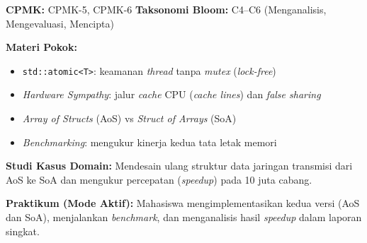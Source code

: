 \documentclass[12pt,a4paper]{article}
\begin{document}
\begin{tcolorbox}[colback=white, colframe=uniblue, title={\textbf{Minggu 14: Konkurensi Modern II --- \textit{Atomics} \& Desain Berorientasi Data}}, fonttitle=\bfseries\color{white}, coltitle=white, colbacktitle=uniblue]
\textbf{CPMK:} CPMK-5, CPMK-6 \hfill \textbf{Taksonomi Bloom:} C4--C6 (Menganalisis, Mengevaluasi, Mencipta)

\textbf{Materi Pokok:}
\begin{itemize}[nosep]
    \item \texttt{std::atomic<T>}: keamanan \textit{thread} tanpa \textit{mutex} (\textit{lock-free})
    \item \textit{Hardware Sympathy}: jalur \textit{cache} CPU (\textit{cache lines}) dan \textit{false sharing}
    \item \textit{Array of Structs} (AoS) vs \textit{Struct of Arrays} (SoA)
    \item \textit{Benchmarking}: mengukur kinerja kedua tata letak memori
\end{itemize}

\textbf{Studi Kasus Domain:}
Mendesain ulang struktur data jaringan transmisi dari AoS ke SoA dan mengukur percepatan (\textit{speedup}) pada 10 juta cabang.

\textbf{Praktikum (Mode Aktif):}
Mahasiswa mengimplementasikan kedua versi (AoS dan SoA), menjalankan \textit{benchmark}, dan menganalisis hasil \textit{speedup} dalam laporan singkat.
\end{tcolorbox}
\end{document}
